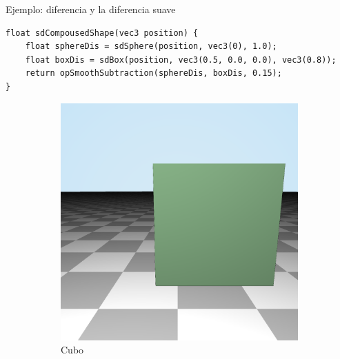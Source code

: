 \begin{frame}[fragile]{Ejemplo: diferencia y la diferencia suave}
\begin{listing}
\begin{verbatim}
float sdCompousedShape(vec3 position) {
    float sphereDis = sdSphere(position, vec3(0), 1.0);
    float boxDis = sdBox(position, vec3(0.5, 0.0, 0.0), vec3(0.8));  
    return opSmoothSubtraction(sphereDis, boxDis, 0.15);
}
\end{verbatim}
\end{listing}

\begin{figure}[htp]
 \centering
 \begin{subfigure}[b]{0.2\textwidth}
   \includegraphics[width=\textwidth]{img/leftBox}
   \caption{Cubo}
 \end{subfigure}
~
 \begin{subfigure}[b]{0.2\textwidth}

\end{subfigure}
\end{figure}
\end{frame}
